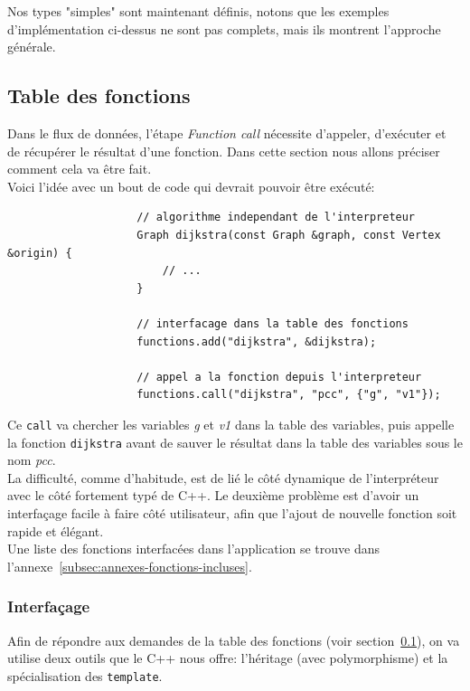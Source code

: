 \documentclass[french]{article}
\begin{document}
				Nos types "simples" sont maintenant définis, notons que les exemples d'implémentation ci-dessus ne sont pas complets, mais ils montrent l'approche générale.
				
		\subsection{Table des fonctions}
			\label{subsec:table-des-fonctions}
			Dans le flux de données, l'étape \textit{Function call} nécessite d'appeler, d'exécuter et de récupérer le résultat d'une fonction. Dans cette section nous allons préciser comment cela va être fait.\\
			
			Voici l'idée avec un bout de code qui devrait pouvoir être exécuté:
			
			\begin{lstlisting}
					// algorithme independant de l'interpreteur
					Graph dijkstra(const Graph &graph, const Vertex &origin) {
						// ...
					}
			
					// interfacage dans la table des fonctions
					functions.add("dijkstra", &dijkstra);
					
					// appel a la fonction depuis l'interpreteur
					functions.call("dijkstra", "pcc", {"g", "v1"});
			\end{lstlisting}
			
			Ce \texttt{call} va chercher les variables \textit{g} et \textit{v1} dans la table des variables, puis appelle la fonction \texttt{dijkstra} avant de sauver le résultat dans la table des variables sous le nom \textit{pcc}.\\
			
			La difficulté, comme d'habitude, est de lié le côté dynamique de l'interpréteur avec le côté fortement typé de C++. Le deuxième problème est d'avoir un interfaçage facile à faire côté utilisateur, afin que l'ajout de nouvelle fonction soit rapide et élégant.\\
			
			Une liste des fonctions interfacées dans l'application se trouve dans l'annexe~\ref{subsec:annexes-fonctions-incluses}. 
			
			\subsubsection{Interfaçage}
				\label{subsubsec:interfacage}
				Afin de répondre aux demandes de la table des fonctions (voir section~\ref{subsec:table-des-fonctions}), on va utilise deux outils que le C++ nous offre: l'héritage (avec polymorphisme) et la spécialisation des \texttt{template}.\\
				
\end{document}
